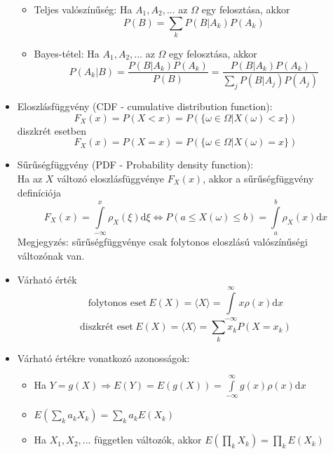 \documentclass[12pt]{article}
\theoremstyle{plain}
\newcommand{\dd}{\textrm{d}}
\begin{document}
\begin{itemize}
\begin{itemize}
            \item Teljes valószínűség: Ha $A_1, A_2, ...$ az $\Omega$ egy felosztása, akkor 
                \begin{equation*}
                    P(B) = \sum\limits_{k} P(B|A_k)P(A_k)
                \end{equation*}
            \item Bayes-tétel: Ha $A_1, A_2, ...$ az $\Omega$ egy felosztása, akkor 
                \begin{equation*}
                    P(A_k|B) = \frac{P(B|A_k)P(A_k)}{P(B)} = \frac{P(B|A_k)P(A_k)}{\sum\limits_{j} P(B|A_j)P(A_j)}
                \end{equation*}
        \end{itemize}
    \item Eloszlásfüggvény (CDF - cumulative distribution function):
        \begin{equation*}
            F_X(x) = P(X<x) = P(\{\omega\in\Omega | X(\omega)<x \})
        \end{equation*}
        diszkrét esetben 
        \begin{equation*}
            F_X(x) = P(X=x) = P(\{\omega\in\Omega | X(\omega)=x \})
        \end{equation*}
    \item Sűrűségfüggvény (PDF - Probability density function):\\
    Ha az $X$ változó eloszlásfüggvénye $F_X(x)$, akkor a sűrűségfüggvény definíciója
        \begin{equation*}
            F_X(x) = \int\limits_{-\infty}^{x}\rho_X(\xi)\dd \xi \Longleftrightarrow P(a \leq X(\omega) \leq b) = \int\limits_{a}^{b}\rho_X(x)\dd x
        \end{equation*}
        Megjegyzés: sűrűségfüggvénye csak folytonos eloszlású valószínűségi változónak van.
    \item Várható érték
    \begin{equation*}
        \text{folytonos eset}~E(X) = \langle X \rangle = \int\limits_{-\infty}^{\infty}x\rho(x) \dd x 
    \end{equation*}
    \begin{equation*}
        \text{diszkrét eset}~E(X) = \langle X \rangle = \sum\limits_{k} x_k P(X=x_k)
    \end{equation*}
    \item Várható értékre vonatkozó azonosságok:
        \begin{itemize}
            \item Ha $Y=g(X) \Rightarrow E(Y) = E(g(X)) = {\displaystyle\int\limits_{-\infty}^{\infty}g(x)\rho(x) \dd x}$  
            \item $E\left(\sum\limits_k a_k X_k\right) = \sum\limits_k a_k E(X_k)$
            \item Ha $X_1, X_2, ...$ független változók, akkor ${\displaystyle E\left(\prod\limits_k X_k\right) = \prod\limits_k E(X_k)}$
        \end{itemize}  
\end{itemize}
\end{document}
